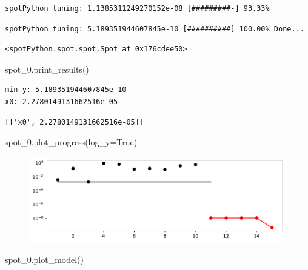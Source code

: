 \documentclass[
  letterpaper,
  DIV=11,
  numbers=noendperiod]{scrreprt}
\newenvironment{Shaded}{\begin{snugshade}}{\end{snugshade}}
\newcommand{\NormalTok}[1]{\textcolor[rgb]{0.00,0.23,0.31}{#1}}
\newcommand{\OperatorTok}[1]{\textcolor[rgb]{0.37,0.37,0.37}{#1}}
\newcommand{\VariableTok}[1]{\textcolor[rgb]{0.07,0.07,0.07}{#1}}
\begin{document}
\begin{verbatim}
spotPython tuning: 1.1385311249270152e-08 [#########-] 93.33% 
\end{verbatim}

\begin{verbatim}
spotPython tuning: 5.189351944607845e-10 [##########] 100.00% Done...
\end{verbatim}

\begin{verbatim}
<spotPython.spot.spot.Spot at 0x176cdee50>
\end{verbatim}

\begin{Shaded}
\begin{Highlighting}[]
\NormalTok{spot\_0.print\_results()}
\end{Highlighting}
\end{Shaded}

\begin{verbatim}
min y: 5.189351944607845e-10
x0: 2.2780149131662516e-05
\end{verbatim}

\begin{verbatim}
[['x0', 2.2780149131662516e-05]]
\end{verbatim}

\begin{Shaded}
\begin{Highlighting}[]
\NormalTok{spot\_0.plot\_progress(log\_y}\OperatorTok{=}\VariableTok{True}\NormalTok{)}
\end{Highlighting}
\end{Shaded}

\begin{figure}[H]

{\centering \includegraphics{007_num_spot_intro_files/figure-pdf/cell-8-output-1.pdf}

}

\end{figure}

\begin{Shaded}
\begin{Highlighting}[]
\NormalTok{spot\_0.plot\_model()}
\end{Highlighting}
\end{Shaded}
\end{document}
